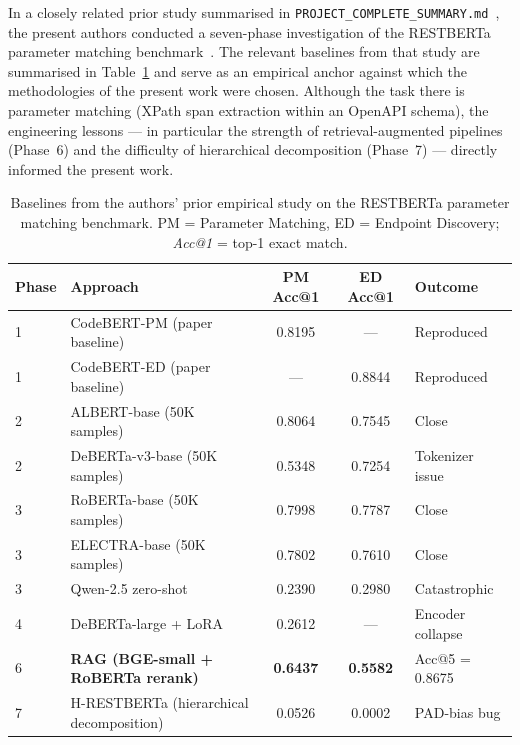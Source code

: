 \documentclass[10pt,a4paper,twocolumn]{article}
\begin{document}
In a closely related prior study summarised in
\texttt{PROJECT\_COMPLETE\_SUMMARY.md}~\cite{ourpriorwork}, the present
authors conducted a seven-phase investigation of the RESTBERTa
parameter matching benchmark~\cite{kotstein2024restberta}. The
relevant baselines from that study are summarised in
Table~\ref{tab:baselines} and serve as an empirical anchor against
which the methodologies of the present work were chosen. Although the
task there is parameter matching (XPath span extraction within an
OpenAPI schema), the engineering lessons --- in particular the
strength of retrieval-augmented pipelines (Phase~6) and the
difficulty of hierarchical decomposition (Phase~7) --- directly
informed the present work.

\begin{table}[t]
\centering
\caption{Baselines from the authors' prior empirical study on the
RESTBERTa parameter matching benchmark. PM = Parameter Matching, ED =
Endpoint Discovery; \emph{Acc@1} = top-1 exact match.}
\label{tab:baselines}
\small
\begin{tabular}{llccl}
\toprule
\textbf{Phase} & \textbf{Approach} & \textbf{PM Acc@1} & \textbf{ED Acc@1} & \textbf{Outcome} \\
\midrule
1 & CodeBERT-PM (paper baseline)            & 0.8195   & ---     & Reproduced \\
1 & CodeBERT-ED (paper baseline)            & ---      & 0.8844  & Reproduced \\
2 & ALBERT-base (50K samples)               & 0.8064   & 0.7545  & Close \\
2 & DeBERTa-v3-base (50K samples)           & 0.5348   & 0.7254  & Tokenizer issue \\
3 & RoBERTa-base (50K samples)              & 0.7998   & 0.7787  & Close \\
3 & ELECTRA-base (50K samples)              & 0.7802   & 0.7610  & Close \\
3 & Qwen-2.5 zero-shot                      & 0.2390   & 0.2980  & Catastrophic \\
4 & DeBERTa-large + LoRA                    & 0.2612   & ---     & Encoder collapse \\
6 & \textbf{RAG (BGE-small + RoBERTa rerank)} & \textbf{0.6437} & \textbf{0.5582} & Acc@5 = 0.8675 \\
7 & H-RESTBERTa (hierarchical decomposition) & 0.0526  & 0.0002  & PAD-bias bug \\
\bottomrule
\end{tabular}
\end{table}
\end{document}
